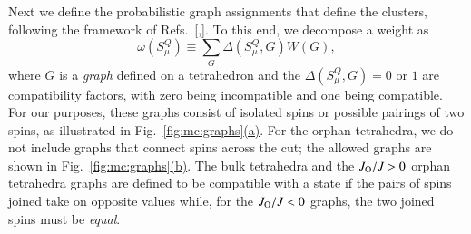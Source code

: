 \documentclass[aps,prx,reprint,runinaddress,superscriptaddress,amsmath,amssymb,floatfix,longbibliography]{revtex4-1}
\newcommand{\Jo}{J_{\rm O}}
\newcommand{\subref}[2]{\ref{#1}\hyperref[#1]{#2}}
\begin{document}
Next we define the probabilistic graph assignments that define the clusters, following the framework of Refs.~[,]. To this end, we decompose a weight as
\begin{equation}
\label{eq:compat}
\omega(S^Q_\mu) \equiv \sum_G \Delta(S^Q_\mu,G) W(G),
\end{equation}
where $G$ is a \emph{graph} defined on a tetrahedron and the $\Delta(S^Q_\mu,G) = 0$ or $1$ are compatibility factors, with zero being incompatible and one being compatible. For our purposes, these graphs consist of isolated spins or possible pairings of two spins, as illustrated in Fig.~\subref{fig:mc:graphs}{(a)}. For the orphan tetrahedra, we do not include graphs that connect spins across the cut; the allowed graphs are shown in Fig.~\subref{fig:mc:graphs}{(b)}. The bulk tetrahedra and the $\Jo/J>0$ orphan tetrahedra graphs are defined to be compatible with a state if the pairs of spins joined take on opposite values while, for the $\Jo/J < 0$ graphs, the two joined spins must be \emph{equal}.
\end{document}
